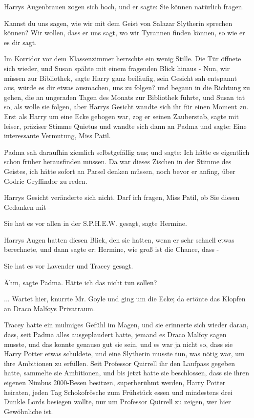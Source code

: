Harrys Augenbrauen zogen sich hoch, und er sagte: \glqq{}Sie können natürlich
fragen.\grqq{}

\glqq{}Kannst du uns sagen, wie wir mit dem Geist von Salazar Slytherin sprechen
können? Wir wollen, dass er uns sagt, wo wir Tyrannen finden können, so wie er
es dir sagt.\grqq{}

Im Korridor vor dem Klassenzimmer herrschte ein wenig Stille. Die Tür öffnete
sich wieder, und Susan spähte mit einem fragenden Blick hinaus - \glqq{}Nun, wir
müssen zur Bibliothek\grqq{}, sagte Harry ganz beiläufig, sein Gesicht sah
entspannt aus, \glqq{}würde es dir etwas ausmachen, uns zu folgen?\grqq{} und
begann in die Richtung zu gehen, die an ungeraden Tagen des Monats zur
Bibliothek führte, und Susan tat so, als wolle sie folgen, aber Harrys Gesicht
wandte sich ihr für einen Moment zu. Erst als Harry um eine Ecke gebogen war,
zog er seinen Zauberstab, sagte mit leiser, präziser Stimme \glqq{}Quietus\grqq{}
und wandte sich dann an Padma und sagte: \glqq{}Eine interessante Vermutung, Miss
Patil.\grqq{}

Padma sah daraufhin ziemlich selbstgefällig aus; und sagte: \glqq{}Ich hätte es
eigentlich schon früher herausfinden müssen. Da war dieses Zischen in der Stimme
des Geistes, ich hätte sofort an Parsel denken müssen, noch bevor er anfing,
über Godric Gryffindor zu reden.\grqq{}

Harrys Gesicht veränderte sich nicht. \glqq{}Darf ich fragen, Miss Patil, ob Sie
diesen Gedanken mit -\grqq{}

\glqq{}Sie hat es vor allen in der S.P.H.E.W. gesagt\grqq{}, sagte Hermine.

Harrys Augen hatten diesen Blick, den sie hatten, wenn er sehr schnell etwas
berechnete, und dann sagte er: \glqq{}Hermine, wie groß ist die Chance, dass
-\grqq{}

\glqq{}Sie hat es vor Lavender und Tracey gesagt.\grqq{}

\glqq{}Ähm\grqq{}, sagte Padma. \glqq{}Hätte ich das nicht tun sollen?\grqq{}

... \glqq{}Wartet hier\grqq{}, knurrte Mr. Goyle und ging um die Ecke; da ertönte
das Klopfen an Draco Malfoys Privatraum.

Tracey hatte ein mulmiges Gefühl im Magen, und sie erinnerte sich wieder daran,
dass, seit Padma alles ausgeplaudert hatte, jemand es Draco Malfoy sagen musste,
und das konnte genauso gut sie sein, und es war ja nicht so, dass sie Harry
Potter etwas schuldete, und eine Slytherin musste tun, was nötig war, um ihre
Ambitionen zu erfüllen. Seit Professor Quirrell ihr den Laufpass gegeben hatte,
sammelte sie Ambitionen, und bis jetzt hatte sie beschlossen, dass sie ihren
eigenen Nimbus 2000-Besen besitzen, superberühmt werden, Harry Potter heiraten,
jeden Tag Schokofrösche zum Frühstück essen und mindestens drei Dunkle Lords
besiegen wollte, nur um Professor Quirrell zu zeigen, wer hier Gewöhnliche ist.

